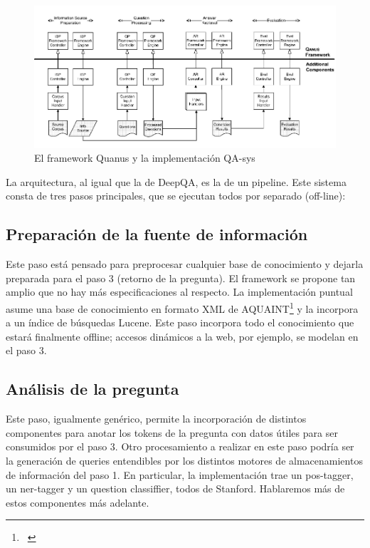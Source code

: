 \begin{figure}
  \centering
    \includegraphics{graficos/Quanus}
  \caption{El framework Quanus y la implementación QA-sys}
  \label{fig:Quanus}
\end{figure}


La arquitectura, al igual que la de DeepQA, es la de un pipeline. Este
sistema consta de tres pasos principales, que se ejecutan todos por
separado (off-line): 


\bigskip

\subsection{Preparación de la fuente de información}
Este paso est\'a pensado para preprocesar cualquier base de conocimiento
y dejarla preparada para el paso 3 (retorno de la pregunta). El
framework se propone tan amplio que no hay m\'as especificaciones al
respecto. La implementaci\'on puntual asume una base de conocimiento en
formato XML de AQUAINT\footnote{\ } y la incorpora a un \'indice de
b\'usquedas Lucene. Este paso incorpora todo el conocimiento que
estar\'a finalmente offline; accesos din\'amicos a la web, por ejemplo,
se modelan en el paso 3.


\bigskip

\subsection{Análisis de la pregunta}
Este paso, igualmente gen\'erico, permite la incorporaci\'on de
distintos componentes para anotar los tokens de la pregunta con datos
\'utiles para ser consumidos por el paso 3. Otro procesamiento a
realizar en este paso podr\'ia ser la generaci\'on de queries
entendibles por los distintos motores de almacenamientos de
informaci\'on del paso 1. En particular, la implementaci\'on trae un
pos-tagger, un ner-tagger y un question classiffier, todos de Stanford.
Hablaremos m\'as de estos componentes m\'as adelante. 


